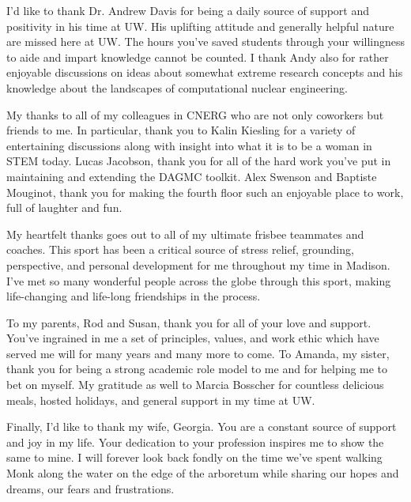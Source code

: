 I'd like to thank Dr. Andrew Davis for being a daily source of support and
positivity in his time at UW. His uplifting attitude and generally helpful
nature are missed here at UW. The hours you've saved students through
your willingness to aide and impart knowledge cannot be counted. I thank Andy
also for rather enjoyable discussions on ideas about somewhat extreme research
concepts and his knowledge about the landscapes of computational nuclear
engineering.

My thanks to all of my colleagues in CNERG who are not only coworkers but
friends to me. In particular, thank you to Kalin Kiesling for a variety of
entertaining discussions along with insight into what it is to be a woman in
STEM today. Lucas Jacobson, thank you for all of the hard work you've put in
maintaining and extending the DAGMC toolkit. Alex Swenson and Baptiste Mouginot,
thank you for making the fourth floor such an enjoyable place to work, full of
laughter and fun.

My heartfelt thanks goes out to all of my ultimate frisbee teammates and
coaches. This sport has been a critical source of stress relief, grounding,
perspective, and personal development for me throughout my time in Madison. I've
met so many wonderful people across the globe through this sport, making
life-changing and life-long friendships in the process.

To my parents, Rod and Susan, thank you for all of your love and support. You've
ingrained in me a set of principles, values, and work ethic which have served me
will for many years and many more to come. To Amanda, my sister, thank you for
being a strong academic role model to me and for helping me to bet on myself. My
gratitude as well to Marcia Bosscher for countless delicious meals, hosted
holidays, and general support in my time at UW.

Finally, I'd like to thank my wife, Georgia. You are a constant source of
support and joy in my life. Your dedication to your profession inspires me to
show the same to mine. I will forever look back fondly on the time we've spent
walking Monk along the water on the edge of the arboretum while sharing our
hopes and dreams, our fears and frustrations.
